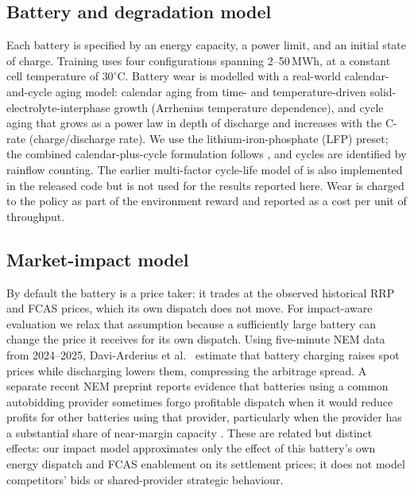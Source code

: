 \documentclass{article}
\begin{document}
\subsection{Battery and degradation model}

Each battery is specified by an energy capacity, a power limit, and an initial
state of charge. Training uses four configurations spanning 2--50\,MWh, at a
constant cell temperature of $30^\circ$C. Battery wear is modelled with a
real-world calendar-and-cycle aging model: calendar aging from time- and
temperature-driven solid-electrolyte-interphase growth (Arrhenius temperature
dependence), and cycle aging that grows as a power law in depth of discharge and
increases with the C-rate (charge/discharge rate). We use the
lithium-iron-phosphate (LFP) preset; the combined calendar-plus-cycle
formulation follows \citet{kampker2025modelling}, and cycles are identified by
rainflow counting. The earlier multi-factor cycle-life model of
\citet{muenzel2015multifactor} is also implemented in the released code but is
not used for the results reported here. Wear is charged to the policy as part of the
environment reward and reported as a cost per unit of throughput.

\subsection{Market-impact model}

By default the battery is a price taker: it trades at the observed historical
RRP and FCAS prices, which its own dispatch does not move. For impact-aware
evaluation we relax that assumption because a sufficiently large battery can
change the price it receives for its own dispatch. Using five-minute NEM data
from 2024--2025, Davi-Arderius et al.~\citep{daviarderius2026merchant}
estimate that battery
charging raises spot prices while discharging lowers them, compressing the
arbitrage spread. A separate recent NEM preprint reports evidence that batteries
using a common autobidding provider sometimes forgo profitable dispatch when it
would reduce profits for other batteries using that provider, particularly when
the provider has a substantial share of near-margin capacity
\citep{eschenbaum2026sharedbidding}. These are related but distinct effects:
our impact model approximates only the effect of this battery's own energy
dispatch and FCAS enablement on its settlement prices; it does not model
competitors' bids or shared-provider strategic behaviour.
\end{document}
